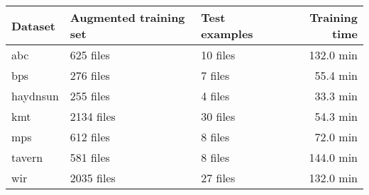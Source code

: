 \begin{tabular}{l|llr}
Dataset        & Augmented training set & Test examples & Training time \\ \hline
\gls{abc}      & 625   files                 & 10 files            & 132.0 min          \\
\gls{bps}      & 276   files                 & 7  files            & 55.4 min      \\
\gls{haydnsun} & 255   files                 & 4  files            & 33.3 min      \\
\gls{kmt}      & 2134  files                 & 30 files            & 54.3 min      \\
\gls{mps}      & 612   files                 & 8  files            & 72.0 min          \\
\gls{tavern}   & 581   files                 & 8  files            & 144.0 min          \\
\gls{wir}      & 2035  files                 & 27 files            & 132.0 min         
\end{tabular}

